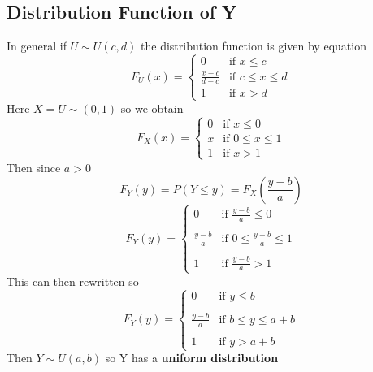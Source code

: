 \documentclass[11pt]{article}
\begin{document}
\subsection{Distribution Function of Y}
In general if $U \sim U(c,d)$ the distribution function is given by
equation
\begin{equation*}
  F_{U}(x) =
  \begin{cases}
                                   0 & \text{if $x \leq c$} \\
                                   \frac{x-c}{d-c} & \text{if $c\leq x \leq d$} \\
                                   1 & \text{if $x>d$}
  \end{cases}
\end{equation*}
Here $X = U \sim (0,1)$ so we obtain
\begin{equation*}
  F_{X}(x) =
  \begin{cases}
                                   0 & \text{if $x \leq 0$} \\
                                   x & \text{if $0\leq x \leq 1$} \\
                                   1 & \text{if $x>1$}
  \end{cases}
\end{equation*}
Then since $a > 0$
\begin{equation*}
    F_{Y}(y) = P(Y \leq y) = F_{X}\left(\frac{y-b}{a}\right)
\end{equation*}
\begin{equation*}
  F_{Y}(y) =
  \begin{cases}
                                   0 & \text{if $\frac{y-b}{a} \leq 0$} \\ \\
                                   \frac{y-b}{a} & \text{if $0 \leq \frac{y-b}{a} \leq 1$} \\ \\
                                   1 & \text{if $\frac{y-b}{a}>1$}
  \end{cases}
\end{equation*}
This can then rewritten so
\begin{equation*}
  F_{Y}(y) =
  \begin{cases}
                                   0 & \text{if $y \leq b$} \\ \\
                                   \frac{y-b}{a} & \text{if $b \leq y \leq a+b$} \\ \\
                                   1 & \text{if $y>a+b$}
  \end{cases}
\end{equation*}
Then $Y \sim U(a,b)$ so Y has a \textbf{uniform distribution}
\end{document}
